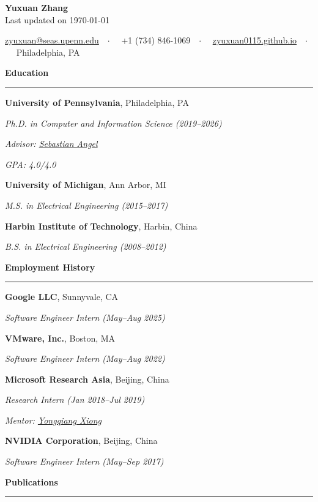 \documentclass[10pt,letterpaper]{article}
\newcommand{\maintitle}[3]{\begin{center}\LARGE\textbf{#1}\\\normalsize #3\end{center}}
\newcommand{\roottitle}[1]{\vspace{0.75em}\noindent\textbf{\large #1}\par\vspace{0.25em}\hrule\vspace{0.6em}}
\newcommand{\headedsection}[3]{\noindent #1\hfill #2\par #3\par}
\newcommand{\headedsubsection}[3]{\noindent \textit{#1}\hfill #2\par #3\par}
\newcommand{\nobreakvspace}[1]{\vspace{#1}}
\newcommand*\bull{$\cdot$}
\newcommand*\sbull{\ \ \bull\ \ }
\begin{document}
\sloppy

\maintitle{Yuxuan Zhang}{}{Last updated on \today}
\nobreakvspace{0.3em}

\noindent
\href{mailto:zyuxuan@seas.upenn.edu}{zyuxuan@seas.upenn.edu}\sbull
+1 (734) 846-1069\sbull
\href{https://zyuxuan0115.github.io}{zyuxuan0115.github.io}\sbull
Philadelphia, PA

\roottitle{Education}

\headedsection{\textbf{University of Pennsylvania}, Philadelphia, PA}{}{
  \headedsubsection{Ph.D. in Computer and Information Science (2019--2026)}{}{}
  \headedsubsection{Advisor: \href{https://www.cis.upenn.edu/~sga001/}{Sebastian Angel}}{}{}
  \headedsubsection{GPA: 4.0/4.0}{}{}
}

\headedsection{\textbf{University of Michigan}, Ann Arbor, MI}{}{
  \headedsubsection{M.S. in Electrical Engineering (2015--2017)}{}{}
}

\headedsection{\textbf{Harbin Institute of Technology}, Harbin, China}{}{
  \headedsubsection{B.S. in Electrical Engineering (2008--2012)}{}{}
}

\roottitle{Employment History}

\headedsection{\textbf{Google LLC}, Sunnyvale, CA}{}{
  \headedsubsection{Software Engineer Intern (May--Aug 2025)}{}{}
}

\headedsection{\textbf{VMware, Inc.}, Boston, MA}{}{
  \headedsubsection{Software Engineer Intern (May--Aug 2022)}{}{}
}

\headedsection{\textbf{Microsoft Research Asia}, Beijing, China}{}{
  \headedsubsection{Research Intern (Jan 2018--Jul 2019)}{}{}
  \headedsubsection{Mentor: \href{https://www.microsoft.com/en-us/research/people/yqx/}{Yongqiang Xiong}}{}{}
}

\headedsection{\textbf{NVIDIA Corporation}, Beijing, China}{}{
  \headedsubsection{Software Engineer Intern (May--Sep 2017)}{}{}
}

\roottitle{Publications}
\end{document}
